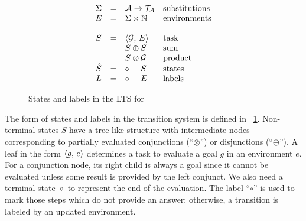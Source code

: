 \begin{figure}[t]
\centering
\[
\begin{array}{ccll}
  \Sigma & = & \mathcal{A} \to \mathcal{T}_\mathcal{A} & \mbox{substitutions} \\
  E & = & \Sigma \times \mathbb{N} & \mbox{environments} \\
  \\
  S & = & \langle \mathcal{G} ,\, E \rangle & \mbox{task} \\
    &   & S \oplus S & \mbox{sum} \\
    &   & S \otimes \mathcal{G} & \mbox{product} \\
  \hat{S} & = & \diamond \; \mid \; S & \mbox{states} \\
  L & = & \circ \; \mid \; E & \mbox{labels} \\
\end{array}
\]
\caption{States and labels in the LTS for \mK}
\label{fig:operanional_semantics_states_labels}
\end{figure}

The form of states and labels in the transition system is defined in \figureword~\ref{fig:operanional_semantics_states_labels}.
Non-terminal states $S$ have a tree-like structure with intermediate nodes corresponding to partially evaluated conjunctions
(``$\otimes$'') or disjunctions (``$\oplus$'').
A leaf in the form $\langle g ,\, e \rangle$ determines a task to evaluate a goal $g$ in an environment $e$. For a conjunction node, its right child
is always a goal since it cannot be evaluated unless some result is provided by the left conjunct.
We also need a terminal state $\diamond$ to represent the end of the evaluation.
The label ``$\circ$'' is used to mark those steps which do not provide an answer; otherwise, a transition is labeled by an updated
environment.

